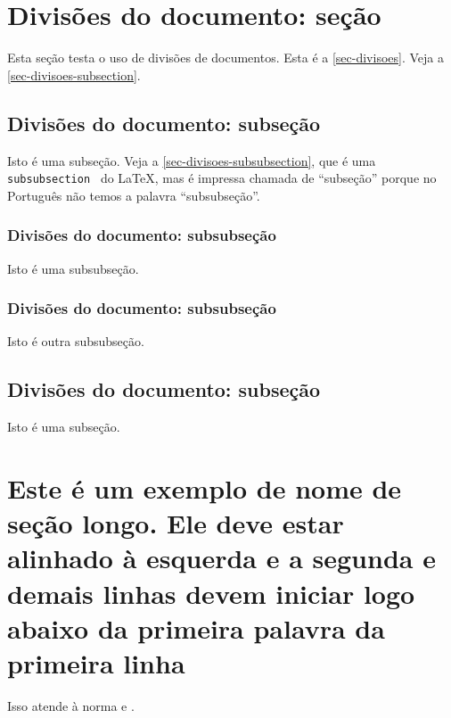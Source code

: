 \section{Divisões do documento: seção}\label{sec-divisoes}

Esta seção testa o uso de divisões de documentos. Esta é a
\autoref{sec-divisoes}. Veja a \autoref{sec-divisoes-subsection}.

\subsection{Divisões do documento: subseção}\label{sec-divisoes-subsection}

Isto é uma subseção. Veja a \autoref{sec-divisoes-subsubsection}, que é uma
\texttt{subsubsection \showfont} do \LaTeX, mas é impressa chamada de ``subseção'' porque
no Português não temos a palavra ``subsubseção''.

\showfont


\subsubsection{Divisões do documento: subsubseção}
\label{sec-divisoes-subsubsection}

Isto é uma subsubseção.

\subsubsection{Divisões do documento: subsubseção}

Isto é outra subsubseção.

\subsection{Divisões do documento: subseção}\label{sec-exemplo-subsec}

Isto é uma subseção.




\section[Exemplo muito longo]{Este é um exemplo de nome de seção longo. Ele deve estar
alinhado à esquerda e a segunda e demais linhas devem iniciar logo abaixo da
primeira palavra da primeira linha}

Isso atende à norma 
 e .

